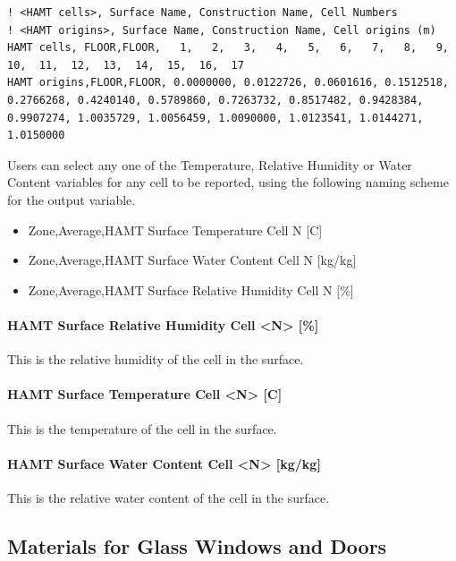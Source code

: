 \begin{lstlisting}
! <HAMT cells>, Surface Name, Construction Name, Cell Numbers
! <HAMT origins>, Surface Name, Construction Name, Cell origins (m)
HAMT cells, FLOOR,FLOOR,   1,   2,   3,   4,   5,   6,   7,   8,   9,  10,  11,  12,  13,  14,  15,  16,  17
HAMT origins,FLOOR,FLOOR, 0.0000000, 0.0122726, 0.0601616, 0.1512518, 0.2766268, 0.4240140, 0.5789860, 0.7263732, 0.8517482, 0.9428384, 0.9907274, 1.0035729, 1.0056459, 1.0090000, 1.0123541, 1.0144271, 1.0150000
\end{lstlisting}

Users can select any one of the Temperature, Relative Humidity or Water Content variables for any cell to be reported, using the following naming scheme for the output variable.

\begin{itemize}
\item
  Zone,Average,HAMT Surface Temperature Cell N {[}C{]}
\item
  Zone,Average,HAMT Surface Water Content Cell N {[}kg/kg{]}
\item
  Zone,Average,HAMT Surface Relative Humidity Cell N {[}\%{]}
\end{itemize}

\paragraph{HAMT Surface Relative Humidity Cell \textless{}N\textgreater{} {[}\%{]}}\label{hamt-surface-relative-humidity-cell-n}

This is the relative humidity of the cell in the surface.

\paragraph{HAMT Surface Temperature Cell \textless{}N\textgreater{} {[}C{]}}\label{hamt-surface-temperature-cell-n-c}

This is the temperature of the cell in the surface.

\paragraph{HAMT Surface Water Content Cell \textless{}N\textgreater{} {[}kg/kg{]}}\label{hamt-surface-water-content-cell-n-kgkg}

This is the relative water content of the cell in the surface.

\subsection{Materials for Glass Windows and Doors}\label{materials-for-glass-windows-and-doors}

